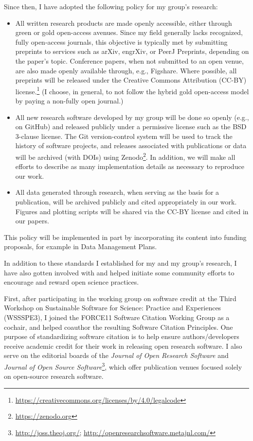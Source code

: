\documentclass[nobib]{tufte-handout}
\begin{document}
Since then, I have adopted the following policy for my group's research:
\begin{itemize}
    \item All written research products are made openly accessible, either through
    green or gold open-access avenues. Since my field generally lacks recognized,
    fully open-access journals, this objective is typically met by submitting
    preprints to services such as arXiv, engrXiv, or PeerJ Preprints, depending
    on the paper's topic. Conference papers, when not submitted to an open venue,
    are also made openly available through, e.g., Figshare. Where possible, all
    preprints will be released under the Creative Commons Attribution (CC-BY)
    license.\footnote{\url{https://creativecommons.org/licenses/by/4.0/legalcode}}
    (I choose, in general, to not follow the hybrid gold open-access model by
    paying a non-fully open journal.)

    \item All new research software developed by my group will be done so openly
    (e.g., on GitHub) and released publicly under a permissive license such as
    the BSD 3-clause license. The Git version-control system will be used to
    track the history of software projects, and releases associated with
    publications or data will be archived (with DOIs) using
    Zenodo\footnote{\url{https://zenodo.org}}.
    In addition, we will make all efforts to describe as many implementation
    details as necessary to reproduce our work.

    \item All data generated through research, when serving as the basis for
    a publication, will be archived publicly and cited appropriately in our
    work. Figures and plotting scripts will be shared via the CC-BY license
    and cited in our papers.
\end{itemize}
This policy will be implemented in part by incorporating its content into
funding proposals, for example in Data Management Plans.

In addition to these standards I established for my and my group's research, I
have also gotten involved with and helped initiate some community efforts to
encourage and reward open science practices.

First, after participating in the working group on software credit at the Third
Workshop on Sustainable Software for Science: Practice and Experiences
(WSSSPE3)\autocite{Katz:2016er}, I joined the FORCE11 Software Citation Working
Group as a cochair, and helped coauthor the resulting Software Citation
Principles\autocite{Smith:2016kt}. One purpose of standardizing software
citation is to help ensure authors\slash developers receive academic credit for
their work in releasing open research software. I also serve on the editorial
boards of the \textit{Journal of Open Research
Software} and \textit{Journal of Open Source Software}\footnote{\url{http://joss.theoj.org/};
\url{http://openresearchsoftware.metajnl.com/}},
which offer publication venues focused solely on open-source research software.
\end{document}
